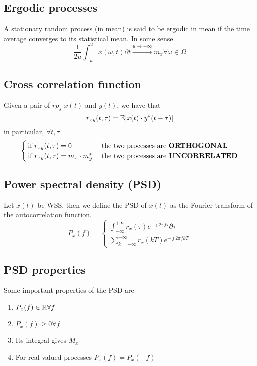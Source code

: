 \subsection{Ergodic processes}
A stationary random process (in mean) is said to be ergodic in mean if the time average converges to its statistical mean. In some sense
\begin{equation}
  \frac{1}{2 u} \int_{-u}^u x(\omega,t) \partial t \stackrel{u \to +\infty}{\rightarrow} m_x \forall \omega \in \Omega
\end{equation}

\subsection{Cross correlation function}
Given a pair of $rp_s$ $x(t)$ and $y(t)$, we have that
\begin{equation}
  r_{xy}(t,\tau) = \mathbb{E}[x(t) \cdot y^*(t-\tau)]
\end{equation}
in particular, $\forall t,\tau$
\begin{equation}
  \begin{cases}
    \text{if } r_{xy}(t,\tau)=0 & \text{ the two processes are \textbf{ORTHOGONAL}}\\
    \text{if } r_{xy}(t,\tau)=m_x \cdot m_y^* & \text{ the two processes are \textbf{UNCORRELATED}}\\

  \end{cases}
\end{equation}

\subsection{Power spectral density (PSD)}
Let $x(t)$ be WSS, then we define the PSD of $x(t)$ as the Fourier transform of the autocorrelation function.
\begin{equation}P_x(f)=
  \begin{cases}
    \int_{-\infty}^{+\infty} r_x(\tau)e^{-\jmath 2\pi f \tau} \partial \tau \\
    \sum\limits_{k=-\infty}^{+\infty} r_x(k T)e^{-\jmath 2\pi f k T}
  \end{cases}
\end{equation}
\subsection{PSD properties}
Some important properties of the PSD are
\begin{enumerate}
  \item $P_x(f)\in \mathbb{R} \forall f$
  \item $P_x(f)\ge 0 \forall f$
  \item Its integral gives $M_x$
  \item For real valued processes $P_x(f)=P_x(-f)$
\end{enumerate}


